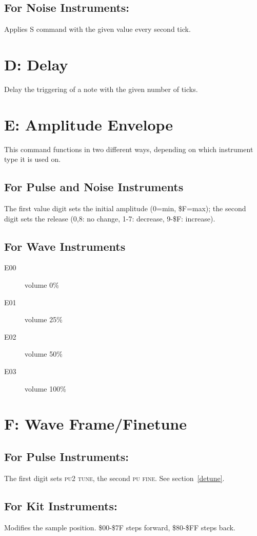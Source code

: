 \subsection{For Noise Instruments:}

Applies S command with the given value every second tick.

\section{D: Delay}

Delay the triggering of a note with the given number of ticks.

\section{E: Amplitude Envelope}

This command functions in two different ways, depending on which instrument type it is used on.

\subsection{For Pulse and Noise Instruments}
The first value digit sets the initial amplitude (0=min, \$F=max); the second digit sets the release (0,8: no change, 1-7: decrease, 9-\$F: increase).

\subsection{For Wave Instruments}
\begin{description}
\item[E00] volume 0\%
\item[E01] volume 25\%
\item[E02] volume 50\%
\item[E03] volume 100\%
\end{description}

\section{F: Wave Frame/Finetune}

\subsection{For Pulse Instruments:}
The first digit sets \textsc{pu2 tune}, the second \textsc{pu fine}.
See section~\ref{detune}.

\subsection{For Kit Instruments:}
Modifies the sample position. \$00-\$7F steps forward, \$80-\$FF steps back.


